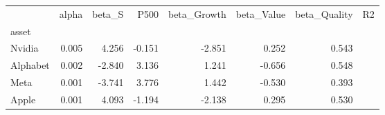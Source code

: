 \begin{tabular}{lrrrrrr}
\toprule
 & alpha & beta_S&P500 & beta_Growth & beta_Value & beta_Quality & R2 \\
asset &  &  &  &  &  &  \\
\midrule
Nvidia & 0.005 & 4.256 & -0.151 & -2.851 & 0.252 & 0.543 \\
Alphabet & 0.002 & -2.840 & 3.136 & 1.241 & -0.656 & 0.548 \\
Meta & 0.001 & -3.741 & 3.776 & 1.442 & -0.530 & 0.393 \\
Apple & 0.001 & 4.093 & -1.194 & -2.138 & 0.295 & 0.530 \\
\bottomrule
\end{tabular}
